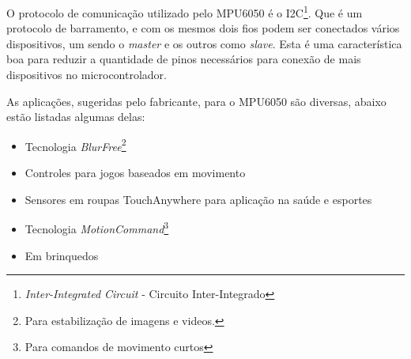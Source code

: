 	O protocolo de comunicação utilizado pelo MPU6050 é o I2C\footnote{\textit{Inter-Integrated Circuit} - Circuito Inter-Integrado}. Que é um protocolo de barramento, e com os mesmos dois fios podem ser conectados vários dispositivos, um sendo o \textit{master} e os outros como \textit{slave}. Esta é uma característica boa para reduzir a quantidade de pinos necessários para conexão de mais dispositivos no microcontrolador.\cite{mpu6050}
	
	As aplicações, sugeridas pelo fabricante, para o MPU6050 são diversas, abaixo estão listadas algumas delas:
	\begin{itemize}
		\item Tecnologia \textit{ BlurFree\texttrademark }\footnote{Para estabilização de imagens e videos.}
		\item Controles para jogos baseados em movimento
		\item Sensores em roupas TouchAnywhere para aplicação na saúde e esportes
		\item Tecnologia \textit{ MotionCommand\texttrademark}\footnote{Para comandos de movimento curtos} 
		\item Em brinquedos
	\end{itemize}
	

